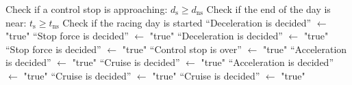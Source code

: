 \begin{algorithmic}
	\State Check if a control stop is approaching: $d_\mathrm{s} \geq d_\mathrm{ns}$
	\State Check if the end of the day is near: $t_\mathrm{s} \geq t_\mathrm{ns}$
	\State Check if the racing day is started
	  
	\State \enquote{Deceleration is decided} $\gets$ "true"
	\Else
	\State \enquote{Stop force is decided} $\gets$ "true"
	\EndIf
	\State \enquote{Deceleration is decided} $\gets$ "true"
	\Else
	\State \enquote{Stop force is decided} $\gets$ "true"
	\State \enquote{Control stop is over} $\gets$ "true"
	\EndIf
	\EndIf
	  
	\State \enquote{Acceleration is decided} $\gets$ "true"
	\Else
	\State \enquote{Cruise is decided} $\gets$ "true"
	\EndIf
	\State \enquote{Acceleration is decided} $\gets$ "true"
	\Else
	\State \enquote{Cruise is decided} $\gets$ "true"
	\EndIf
	\Else
	\State \enquote{Cruise is decided} $\gets$ "true"  
	\EndIf

\end{algorithmic}